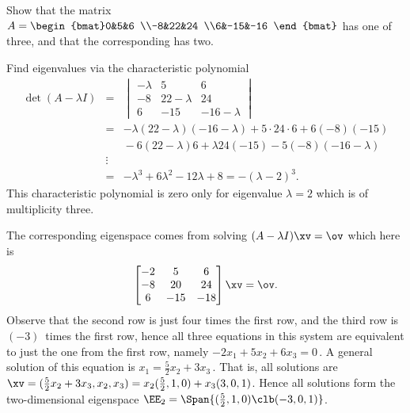 \begin{example} 
Show that the matrix \(A=\begin{bmat}0&5&6
\\-8&22&24
\\6&-15&-16 \end{bmat}\) has one  of  three, and that the corresponding  has  two.
\begin{solution} 
Find eigenvalues via the characteristic polynomial
\begin{eqnarray*}
\det(A-\lambda I)
&=&
\begin{vmatrix} -\lambda&5&6
\\-8&22-\lambda&24
\\6&-15&-16-\lambda \end{vmatrix}
\\&=&-\lambda(22-\lambda)(-16-\lambda)+5\cdot24\cdot6+6(-8)(-15)
\\&&{}-6(22-\lambda)6+\lambda24(-15)-5(-8)(-16-\lambda)
\\&\vdots&
\\&=&-\lambda^3+6\lambda^2-12\lambda+8
=-(\lambda-2)^3.
\end{eqnarray*}
This characteristic polynomial is zero only for eigenvalue \(\lambda=2\) which is of multiplicity three.

The corresponding eigenspace comes from solving \((A-\lambda I)\xv=\ov\) which here is
\begin{equation*}
\begin{bmatrix}-2&5&6
\\-8&20&24
\\6&-15&-18 \end{bmatrix}\xv=\ov.
\end{equation*}
Observe that the second row is just four times the first row, and the third row is \((-3)\)~times the first row, hence all three equations in this system are equivalent to just the one from the first row, namely \(-2x_1+5x_2+6x_3=0\)\,.
A general solution of this equation is \(x_1=\tfrac52x_2+3x_3\)\,.
That is, all solutions are \(\xv=(\tfrac52x_2+3x_3,x_2,x_3)=x_2(\tfrac52,1,0)+x_3(3,0,1)\). 
Hence all solutions form the two-dimensional eigenspace 
\(\EE_2=\Span\{(\tfrac52,1,0)\clb (-3,0,1)\}\).
\end{solution}
\end{example}



